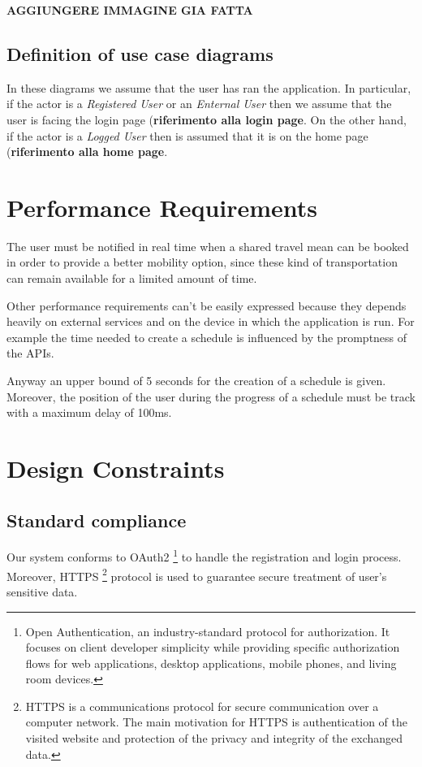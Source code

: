 \textbf{AGGIUNGERE IMMAGINE GIA FATTA}

\subsection{Definition of use case diagrams}
In these diagrams we assume that the user has ran the application. In particular, if the actor is a \textit{Registered User} or an \textit{Enternal User} then we assume that the user is facing the login page (\textbf{riferimento alla login page}. On the other hand, if the actor is a \textit{Logged User} then is assumed that it is on the home page (\textbf{riferimento alla home page}.

\section{Performance Requirements}
The user must be notified in real time when a shared travel mean can be booked in order to provide a better mobility option,
since these kind of transportation can remain available for a limited amount of time.

Other performance requirements can't be easily expressed because they depends heavily on external services and on the device in which the application is run. For example the time needed to create a schedule is influenced by the promptness of the APIs.

Anyway an upper bound of 5 seconds for the creation of a schedule is given. Moreover, the position of the user during the progress of a schedule must be track with a maximum delay of 100ms.

\section{Design Constraints}

\subsection{Standard compliance}
Our system conforms to OAuth2 \footnote{Open Authentication, an industry-standard protocol for authorization. It focuses on client developer simplicity while providing specific authorization flows for web applications, desktop applications, mobile phones, and living room devices.} to handle the registration and login process. 
Moreover, HTTPS \footnote{HTTPS is a communications protocol for secure communication over a computer network. The main motivation for HTTPS is authentication of the visited website and protection of the privacy and integrity of the exchanged data.} protocol is used to guarantee secure treatment of user's sensitive data.

